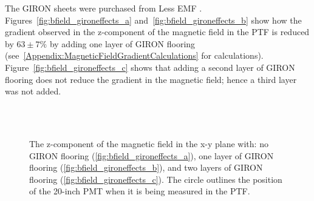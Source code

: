 The GIRON sheets were purchased from Less EMF \cite{lessemf}. Figures~\ref{fig:bfield_gironeffects_a} and~\ref{fig:bfield_gironeffects_b} show how the gradient observed in the z-component of the magnetic field in the PTF is reduced by $ 63\pm7\% $ by adding one layer of GIRON flooring (see~\ref{Appendix:MagneticFieldGradientCalculations} for calculations).
Figure~\ref{fig:bfield_gironeffects_c} shows that adding a second layer of GIRON flooring does not reduce the gradient in the magnetic field; hence a third layer was not added.
%
\begin{figure}[htbp]
  \begin{center}
    \\
    \vspace{-3 mm}
    \\
    \vspace{-3 mm}
  \caption{The z-component of the magnetic field in the x-y plane with: no GIRON flooring (\ref{fig:bfield_gironeffects_a}), one layer of GIRON flooring (\ref{fig:bfield_gironeffects_b}), and two layers of GIRON flooring (\ref{fig:bfield_gironeffects_c}). The circle outlines the position of the 20-inch PMT when it is being measured in the PTF.}
  \label{fig:bfield_gironeffects}
  \end{center}
\end{figure}
%

